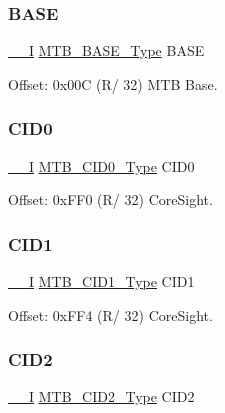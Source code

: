 \mbox{\label{struct_mtb_a5181cd5228fec76207863470746aee70}} 
\subsubsection{\texorpdfstring{BASE}{BASE}}
{\footnotesize\ttfamily \mbox{\hyperlink{core__cm0plus_8h_af63697ed9952cc71e1225efe205f6cd3}{\+\_\+\+\_\+I}} \mbox{\hyperlink{union_m_t_b___b_a_s_e___type}{M\+T\+B\+\_\+\+B\+A\+S\+E\+\_\+\+Type}} B\+A\+SE}



Offset\+: 0x00C (R/ 32) M\+TB Base. 

\mbox{\label{struct_mtb_a8135e3c229825e6e1a11b24e4d334761}} 
\subsubsection{\texorpdfstring{CID0}{CID0}}
{\footnotesize\ttfamily \mbox{\hyperlink{core__cm0plus_8h_af63697ed9952cc71e1225efe205f6cd3}{\+\_\+\+\_\+I}} \mbox{\hyperlink{union_m_t_b___c_i_d0___type}{M\+T\+B\+\_\+\+C\+I\+D0\+\_\+\+Type}} C\+I\+D0}



Offset\+: 0x\+F\+F0 (R/ 32) Core\+Sight. 

\mbox{\label{struct_mtb_aa37a3b0828e46a7b056de7beb1db7604}} 
\subsubsection{\texorpdfstring{CID1}{CID1}}
{\footnotesize\ttfamily \mbox{\hyperlink{core__cm0plus_8h_af63697ed9952cc71e1225efe205f6cd3}{\+\_\+\+\_\+I}} \mbox{\hyperlink{union_m_t_b___c_i_d1___type}{M\+T\+B\+\_\+\+C\+I\+D1\+\_\+\+Type}} C\+I\+D1}



Offset\+: 0x\+F\+F4 (R/ 32) Core\+Sight. 

\mbox{\label{struct_mtb_aa14ff06c97ce5f86f6a1fa1c551d455e}} 
\subsubsection{\texorpdfstring{CID2}{CID2}}
{\footnotesize\ttfamily \mbox{\hyperlink{core__cm0plus_8h_af63697ed9952cc71e1225efe205f6cd3}{\+\_\+\+\_\+I}} \mbox{\hyperlink{union_m_t_b___c_i_d2___type}{M\+T\+B\+\_\+\+C\+I\+D2\+\_\+\+Type}} C\+I\+D2}



